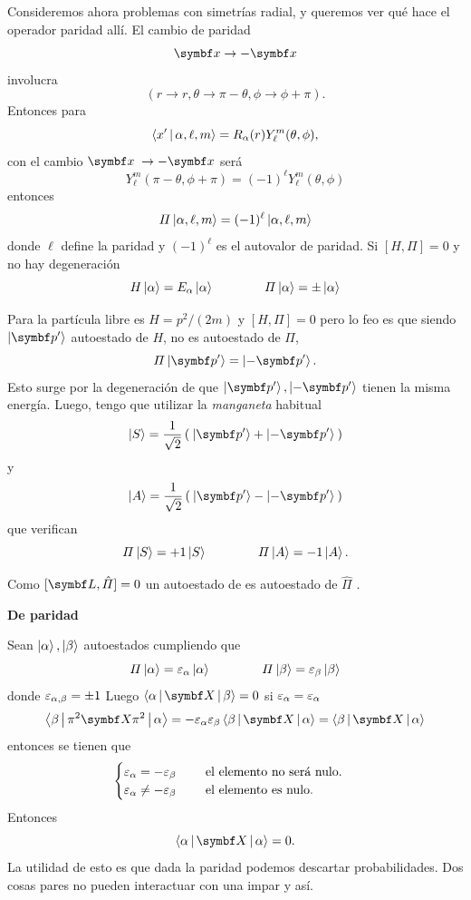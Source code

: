 \documentclass[10pt,oneside]{CBFT_book}
\begin{document}
Consideremos ahora problemas con simetrías radial, y queremos ver qué hace el operador paridad allí.
El cambio de paridad 
\[
	\vb{x} \to -\vb{x} 
\]
involucra
\[
	\left( r\to r, \theta \to \pi-\theta, \phi \to \phi+\pi \right).
\]
Entonces para
\[
	\Braket{x'|\alpha,\ell,m} = R_\alpha(r) Y_\ell^m(\theta,\phi), 
\]
con el cambio $ \vb{x} \; \to -\vb{x} $ será
\[
	Y_\ell^m(\pi-\theta,\phi+\pi) = (-1)^\ell Y_\ell^m(\theta,\phi)
\]
entonces
\[
	\Pi\Ket{\alpha,\ell,m} =  (-1)^\ell \Ket{\alpha,\ell,m}
\]
donde $\ell$ define la paridad y $(-1)^\ell$ es el autovalor de paridad.
Si $[H,\Pi] = 0$ y no hay degeneración
\[
	H \Ket{\alpha} = E_{\alpha} \Ket{\alpha} \qquad \qquad \Pi \Ket{\alpha} = \pm \Ket{\alpha}
\]

Para la partícula libre es $H = p^2/(2m)$ y $[H,\Pi] = 0$ pero lo feo es que siendo $\Ket{\vb p'}$ autoestado
de $H$, no es autoestado de $\Pi$,
\[
	\Pi \Ket{\vb p'} = \Ket{-\vb p'}.
\]
Esto surge por la degeneración de que $\Ket{\vb p'}, \Ket{-\vb p'}$ tienen la misma energía.
Luego, tengo que utilizar la {\it manganeta} habitual
\[
	\Ket{S} = \frac{1}{\sqrt{2}} \left( \: \Ket{\vb p'} + \Ket{-\vb p'} \: \right)
\]
y
\[
	\Ket{A} = \frac{1}{\sqrt{2}} \left( \: \Ket{\vb p'} - \Ket{-\vb p'} \: \right)
\]
que verifican
\[
	\Pi \Ket{S} = +1 \Ket{S} \qquad \qquad \Pi \Ket{A} = -1 \Ket{A}.
\]

Como $[\vb{L},\hat{\Pi}]=0$ un autoestado de  es autoestado de $\hat{\Pi}$ .

\begin{ejemplo}{\bf De paridad}

Sean $\Ket{\alpha}, \Ket{\beta}$ autoestados cumpliendo que
\[
	\Pi \Ket{\alpha} = \varepsilon_\alpha \Ket{\alpha} \qquad \qquad 
	\Pi \Ket{\beta} = \varepsilon_\beta \Ket{\beta}
\]
donde $\varepsilon_{\alpha,\beta} = \pm 1$
Luego $ \Braket{\a|\vb X|\b} = 0 $ si $\varepsilon_\alpha = \varepsilon_\alpha$
\[
	\Braket{ \b | \pi^2 \vb X \pi^2 | \a } = - \varepsilon_\a \varepsilon_\b 
	\Braket{ \b | \vb X | \a } = \Braket{ \b | \vb X | \a}
\]
entonces se tienen que 
\[
	\begin{cases}
		\varepsilon_\alpha = - \varepsilon_\beta \qquad \text{ el elemento no será nulo.} \\
		\varepsilon_\alpha \neq - \varepsilon_\beta \qquad \text{ el elemento es nulo.}
	\end{cases}
\]
Entonces
\[
	\Braket{\a|\vb X|\a} = 0.
\]
La utilidad de esto es que dada la paridad podemos descartar probabilidades. 
Dos cosas pares no pueden interactuar con una impar y así.
 
\end{ejemplo}
\end{document}
